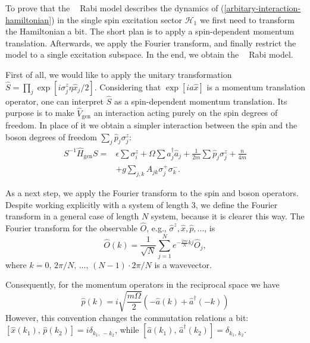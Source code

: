 \documentclass[reprint, aps, prx, amsmath, amssymb, longbibliography, superscriptaddress]{revtex4-2}
\DeclareMathOperator{\Zthree}{\mathbb{Z}_3}
\begin{document}
To prove that the $\Zthree$ Rabi model describes the dynamics of (\ref{arbitary-interaction-hamiltonian}) in the single spin excitation sector $\mathcal{H}_1$ we first need to transform the Hamiltonian a bit. The short plan is to apply a spin-dependent momentum translation. Afterwards, we apply the Fourier transform, and finally restrict the model to a single excitation subspace. In the end, we obtain the $\Zthree$ Rabi model.

First of all, we would like to apply the unitary transformation $ \hat S = \prod_j\exp[i\sigma_j^z \eta \hat x_j/2] $. Considering that $\exp[ia\hat x]$ is a momentum translation operator, one can interpret $\hat S$  as a spin-dependent momentum
translation.  Its purpose is to make $\hat V_{\text{gen}} $ an interaction acting purely on the spin degrees of freedom. In place of it we obtain a simpler interaction between the spin and the boson degrees of freedom $\sum_j \hat p_j \sigma_j^z$: 
\begin{equation}
\begin{aligned}
    S^{-1} \hat H_{\text{gen}} S = &\epsilon \sum \sigma_i^z + \Omega \sum \hat a_j^{\dagger} \hat a_j + \frac{1}{2 m}\sum \hat p_j \sigma_j^z + \frac{n}{4m} \\
    &+ g \sum\limits_{j,k} A_{jk} \sigma_j^+ \sigma_{k}^-.
\end{aligned}
\end{equation}

As a next step, we apply the Fourier transform to the spin and boson operators. Despite working explicitly with a system of length $3$, we define the Fourier transform in a general case of length $N$ system, because it is clearer this way. 
The Fourier transform for the observable $\hat O$, e.g., $\hat \sigma^z, \hat x, \hat p, \dots $, is
\begin{equation}
    \hat O(k) = \frac{1}{\sqrt{N}}\sum\limits_{j=1}^N e^{-\frac{2\pi i}{N}kj} \hat O_j,
\end{equation}
where $k = 0,\,  2 \pi/N, \, \dots, \, (N-1)\cdot 2\pi/N$ is a wavevector.

Consequently, for the momentum operators in the reciprocal space we have
\begin{equation}
    \hat p(k) = i \sqrt{\frac{m\Omega}{2}}\left( -\hat a(k) + \hat a^{\dagger}(-k) \right)
\end{equation}
However, this convention changes the commutation relations a bit: $[\hat x(k_1),\, \hat p(k_2)] = i \delta_{k_1,\,-k_2}$, while $[\hat a(k_1),\, \hat a^{\dagger}(k_2)] = \delta_{k_1,\,k_2}$.
\end{document}
